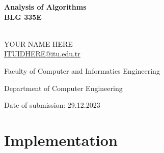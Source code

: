 \documentclass[12pt]{report}
\author{ebicer}
\numberwithin{figure}{chapter}
\begin{document}
\begin{titlepage}
\begin{center}
    \vspace*{-3cm}
    
    \vspace{2.3cm}
    

    \vspace{1cm}
    {\textbf{Analysis of Algorithms\\}}
    \vspace{0.3cm}
    {\textbf{BLG 335E\\}}
    \vspace{2.4cm}
    
    {}\\
    YOUR NAME HERE \\ \href{mailto:ITUIDHERE@itu.edu.tr}{ITUIDHERE@itu.edu.tr}\\
    \vspace{0.9cm}

\end{center}
{\raggedleft\vfill{\begin{singlespace}
     Faculty of Computer and Informatics Engineering\\
\end{singlespace}
 Department of Computer Engineering\\
 \begin{singlespace}
 Date of submission: 29.12.2023\\
 
 
 \end{singlespace}
}\par
}
\end{titlepage}

\newpage

\chapter{Implementation}
 
\end{document}
